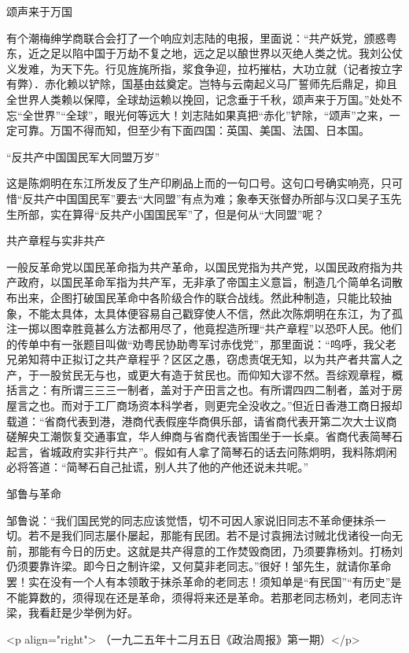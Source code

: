 颂声来于万国

有个潮梅绅学商联合会打了一个响应刘志陆的电报，里面说：“共产妖党，颁惑粤东，近之足以陷中国于万劫不复之地，远之足以酿世界以灭绝人类之忧。我刘公仗义发难，为天下先。行见旌旄所指，浆食争迎，拉朽摧枯，大功立就（记者按立字有弊）．赤化赖以铲除，国基由兹奠定。岂特与云南起义马厂誓师先后鼎足，抑且全世界人类赖以保障，全球劫运赖以挽回，记念垂于千秋，颂声来于万国。”处处不忘“全世界”“全球”，眼光何等远大！刘志陆如果真把“赤化”铲除，“颂声”之来，一定可靠。万国不得而知，但至少有下面四国：英国、美国、法国、日本国。

“反共产中国国民军大同盟万岁”

这是陈炯明在东江所发反了生产印刷品上而的一句口号。这句口号确实响亮，只可惜“反共产中国国民军”要去“大同盟”有点为难；象奉天张督办所部与汉口吴子玉先生所部，实在算得“反共产小国国民军”了，但是何从“大同盟”呢？

共产章程与实非共产

一般反革命党以国民革命指为共产革命，以国民党指为共产党，以国民政府指为共产政府，以国民革命军指为共产军，无非承了帝国主义意旨，制造几个简单名词散布出来，企图打破国民革命中各阶级合作的联合战线。然此种制造，只能比较抽象，不能太具体，太具体便容易自己戳穿使人不信，然此次陈炯明在东江，为了孤注一掷以图幸胜竟甚么方法都用尽了，他竟揑造所理“共产章程”以恐吓人民。他们的传单中有一张题目叫做“劝粤民协助粤军讨赤伐党”，那里面说：“呜呼，我父老兄弟知蒋中正拟订之共产章程乎？区区之愚，窃虑责氓无知，以为共产者共富人之产，于一股贫民无与也，或更大有造于贫民也。而仰知大谬不然。吾综观章程，概括言之：有所谓三三三一制者，盖对于产田言之也。有所谓四四二制者，盖对于房屋言之也。而对于工厂商场资本科学者，则更完全没收之。”但近日香港工商日报却载道：“省商代表到港，港商代表假座华商俱乐部，请省商代表开第二次大士议商磋解央工潮恢复交通事宜，华人绅商与省商代表皆围坐于一长桌。省商代表简琴石起言，省城政府实非行共产”。假如有人拿了简琴石的话去问陈炯明，我料陈炯闲必将答道：“简琴石自己扯谎，别人共了他的产他还说未共呢。”

邹鲁与革命

邹鲁说：“我们国民党的同志应该觉悟，切不可因人家说旧同志不革命便抹杀一切。若不是我们同志屡仆屡起，那能有民团。若不是讨袁拥法讨贼北伐诸役一向无前，那能有今日的历史。这就是共产得意的工作焚毁商团，乃须要靠杨刘。打杨刘仍须要靠许梁。即今日之制许梁，又何莫非老同志。”很好！邹先生，就请你革命罢！实在没有一个人有本领敢于抹杀革命的老同志！须知单是“有民国”“有历史”是不能算数的，须得现在还是革命，须得将来还是革命。若那老同志杨刘，老同志许梁，我看赶是少举例为好。

<p align="right">
（一九二五年十二月五日《政治周报》第一期）</p>

